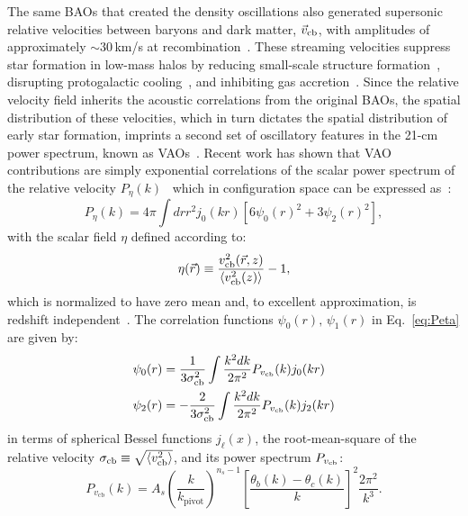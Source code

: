 \documentclass[floats,floatfix,showpacs,amssymb,prd,twocolumn,superscriptaddress,nofootinbib,reprint,preprintnumbers]{revtex4-2}
\begin{document}
The same BAOs that created the density oscillations also generated supersonic relative velocities between baryons and dark matter, $\vec{v}_{\rm cb}$, with amplitudes of approximately $\sim 30\,$km/s at recombination~\citep{tseliakhovich10, dalal10}. These streaming velocities suppress star formation in low-mass halos by reducing small-scale structure formation~\citep{mcquinn12,fialkov12,tseliakhovich10,naoz12, bovy13,munoz19}, disrupting protogalactic cooling~\citep{dalal10, greif11, hirano18, schauer19}, and inhibiting gas accretion~\citep{dalal10, tseliakhovich11, stacy11, oleary12, naoz13}.  Since the relative velocity field inherits the acoustic correlations from the original BAOs, the spatial distribution of these velocities, which in turn dictates the spatial distribution of early star formation, imprints a second set of oscillatory features in the 21-cm power spectrum, known as VAOs~\citep{visbal12, mcquinn12, fialkov12, Fialkov:2013uwm, munoz19}.  Recent work has shown that VAO contributions are simply exponential correlations of the scalar power spectrum of the relative velocity $P_\eta(k)$~\cite{Cruz:2024fsv} which in configuration space 
can be expressed as~\cite{dalal10}:
\begin{equation}
    P_\eta(k) =4 \pi \int d r r^2 j_0(k r)\left[6 \psi_0(r)^2+3 \psi_2(r)^2\right], \label{eq:Peta}
\end{equation}
with the scalar field $\eta$ defined according to:
\begin{equation}
    \eta(\vec{r})\equiv \frac{v^2_{\rm cb}(\vec{r},z)}{\left\langle v_{\rm cb}^2(z)\right\rangle}-1,
\end{equation}
which is normalized to have zero mean and, to excellent approximation, is redshift independent~\cite{ferraro12}. The correlation functions $\psi_0(r),\,\psi_1(r)$ in Eq.~\eqref{eq:Peta} are given by:
\begin{align}
    \psi_0(r)&=\frac{1}{3\sigma_{\rm cb}^2} \int \frac{k^2 d k}{2 \pi^2} P_{v_{\mathrm{cb}}}(k) j_0(k r) \\
    \psi_2(r)&=-\frac{2}{3\sigma_{\rm cb}^2} \int \frac{k^2 d k}{2 \pi^2} P_{v_{\mathrm{cb}}}(k) j_2(k r) 
\end{align}
in terms of spherical Bessel functions $j_\ell(x)$, the root-mean-square of the relative velocity $\sigma_{\rm cb}\equiv\sqrt{\left\langle v_{\rm cb}^2\right\rangle}$, and its power spectrum $P_{v_{\rm cb}}$:
\begin{equation}
P_{v_{\mathrm{cb}}}(k)=A_s\left(\frac{k}{k_{\mathrm{pivot}}}\right)^{n_s-1}\left[\frac{\theta_b(k)-\theta_c(k)}{k}\right]^2 \frac{2 \pi^2}{k^3}.\label{eq:Pvcb}
\end{equation}
\end{document}

